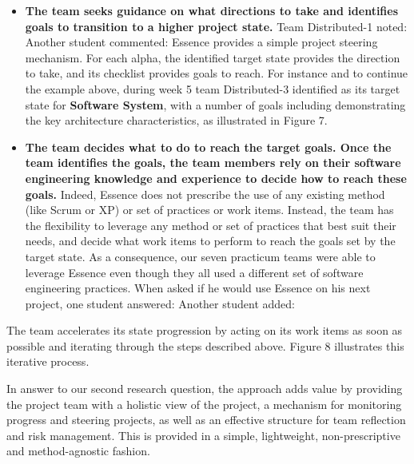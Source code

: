 \begin{itemize}
    \item \textbf{The team seeks guidance on what directions to take and identifies goals to transition to a higher project state.} Team Distributed-1 noted:  Another student commented:  Essence provides a simple project steering mechanism. For each alpha, the identified target state provides the direction to take, and its checklist provides goals to reach. For instance and to continue the example above, during week 5 team Distributed-3 identified  as its target state for \textbf{Software System}, with a number of goals including demonstrating the key architecture characteristics, as illustrated in Figure 7.
    
    \item \textbf{The team decides what to do to reach the target goals. Once the team identifies the goals, the team members rely on their software engineering knowledge and experience to decide how to reach these goals.} Indeed, Essence does not prescribe the use of any existing method (like Scrum or XP) or set of practices or work items. Instead, the team has the flexibility to leverage any method or set of practices that best suit their needs, and decide what work items to perform to reach the goals set by the target state. As a consequence, our seven practicum teams were able to leverage Essence even though they all used a different set of software engineering practices. When asked if he would use Essence on his next project, one student answered:  Another student added: 
\end{itemize}

The team accelerates its state progression by acting on its work items as soon as possible and iterating through the steps described above. Figure 8 illustrates this iterative process.

In answer to our second research question, the approach adds value by providing the project team with a holistic view of the project, a mechanism for monitoring progress and steering projects, as well as an effective structure for team reflection and risk management. This is provided in a simple, lightweight, non-prescriptive and method-agnostic fashion.

